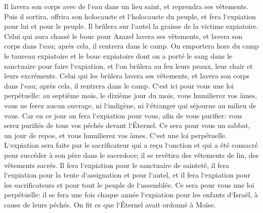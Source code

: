 \verse Il lavera son corps avec de l`eau dans un lieu saint, et reprendra ses vêtements. Puis il sortira, offrira son holocauste et l`holocauste du peuple, et fera l`expiation pour lui et pour le peuple. 
\verse Il brûlera sur l`autel la graisse de la victime expiatoire. 
\verse Celui qui aura chassé le bouc pour Azazel lavera ses vêtements, et lavera son corps dans l`eau; après cela, il rentrera dans le camp. 
\verse On emportera hors du camp le taureau expiatoire et le bouc expiatoire dont on a porté le sang dans le sanctuaire pour faire l`expiation, et l`on brûlera au feu leurs peaux, leur chair et leurs excréments. 
\verse Celui qui les brûlera lavera ses vêtements, et lavera son corps dans l`eau; après cela, il rentrera dans le camp. 
\verse C`est ici pour vous une loi perpétuelle: au septième mois, le dixième jour du mois, vous humilierez vos âmes, vous ne ferez aucun ouvrage, ni l`indigène, ni l`étranger qui séjourne au milieu de vous. 
\verse Car en ce jour on fera l`expiation pour vous, afin de vous purifier: vous serez purifiés de tous vos péchés devant l`Éternel. 
\verse Ce sera pour vous un sabbat, un jour de repos, et vous humilierez vos âmes. C`est une loi perpétuelle. 
\verse L`expiation sera faite par le sacrificateur qui a reçu l`onction et qui a été consacré pour succéder à son père dans le sacerdoce; il se revêtira des vêtements de lin, des vêtements sacrés. 
\verse Il fera l`expiation pour le sanctuaire de sainteté, il fera l`expiation pour la tente d`assignation et pour l`autel, et il fera l`expiation pour les sacrificateurs et pour tout le peuple de l`assemblée. 
\verse Ce sera pour vous une loi perpétuelle: il se fera une fois chaque année l`expiation pour les enfants d`Israël, à cause de leurs péchés. On fit ce que l`Éternel avait ordonné à Moïse. 

